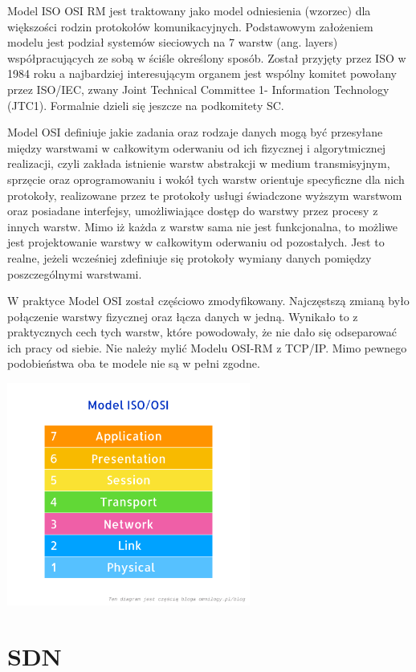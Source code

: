 \documentclass{article}
\begin{document}
Model ISO OSI RM jest traktowany jako model odniesienia (wzorzec) dla większości rodzin protokołów komunikacyjnych. Podstawowym założeniem modelu jest podział systemów sieciowych na 7 warstw (ang. layers) współpracujących ze sobą w ściśle określony sposób. Został przyjęty przez ISO w 1984 roku a najbardziej interesującym organem jest wspólny komitet powołany przez ISO/IEC, zwany Joint Technical Committee 1- Information Technology (JTC1). Formalnie dzieli się jeszcze na podkomitety SC.
 
 Model OSI definiuje jakie zadania oraz rodzaje danych mogą być przesyłane między warstwami w całkowitym oderwaniu od ich fizycznej i algorytmicznej realizacji, czyli zakłada istnienie warstw abstrakcji w medium transmisyjnym, sprzęcie oraz oprogramowaniu i wokół tych warstw orientuje specyficzne dla nich protokoły, realizowane przez te protokoły usługi świadczone wyższym warstwom oraz posiadane interfejsy, umożliwiające dostęp do warstwy przez procesy z innych warstw. Mimo iż każda z warstw sama nie jest funkcjonalna, to możliwe jest projektowanie warstwy w całkowitym oderwaniu od pozostałych. Jest to realne, jeżeli wcześniej zdefiniuje się protokoły wymiany danych pomiędzy poszczególnymi warstwami.
 
 W praktyce Model OSI został częściowo zmodyfikowany. Najczęstszą zmianą było połączenie warstwy fizycznej oraz łącza danych w jedną. Wynikało to z praktycznych cech tych warstw, które powodowały, że nie dało się odseparować ich pracy od siebie. Nie należy mylić Modelu OSI-RM z TCP/IP. Mimo pewnego podobieństwa oba te modele nie są w pełni zgodne.
 

\begin{center}
\includegraphics[width=0.6\textwidth]{OSI.png}
\end{center}
\newpage

\section{SDN}
\end{document}
